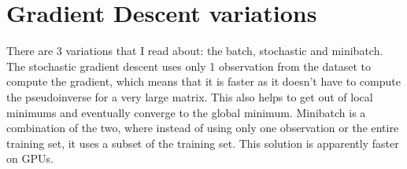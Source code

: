 \documentclass[12pt,a4paper]{article}
\begin{document}
\section{Gradient Descent variations} 
There are 3 variations that I read about: the batch, stochastic and minibatch. The stochastic gradient descent uses only 1 observation from the dataset to compute the gradient, which means that it is faster as it doesn't have to compute the pseudoinverse for a very large matrix. This also helps to get out of local minimums and eventually converge to the global minimum. Minibatch is a combination of the two, where instead of using only one observation or the entire training set, it uses a subset of the training set. This solution is apparently faster on GPUs.

\maketitle
\end{document}
